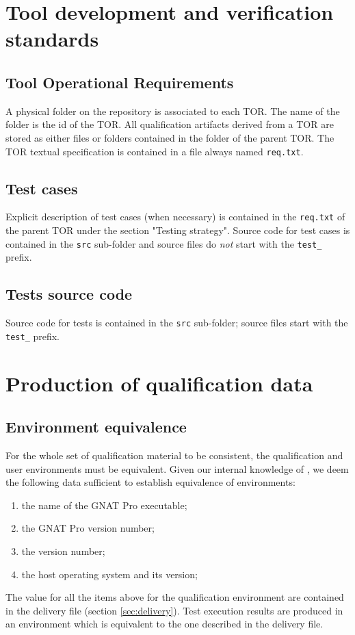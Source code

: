 \documentclass {report}
\begin{document}
\section{Tool development and verification standards}
\subsection{Tool Operational Requirements}
A physical folder on the repository is associated to each TOR. The name of the folder is the id of the TOR. All qualification artifacts derived from a TOR are stored as either files or folders contained in the folder of the parent TOR. The TOR textual specification is contained in a file always named \texttt{req.txt}.

\subsection{Test cases}
Explicit description of test cases (when necessary) is contained in the \texttt{req.txt} of the parent TOR under the section "Testing strategy". Source code for test cases is contained in the \texttt{src} sub-folder and source files do \emph{not} start with the \texttt{test\_} prefix. 

\subsection{Tests source code}
Source code for tests is contained in the \texttt{src} sub-folder; source files start with the \texttt{test\_} prefix. 

\section{Production of qualification data}

\subsection{Environment equivalence}
\label{sec:equivalence}
For the whole set of qualification material to be consistent, the qualification and user environments must be equivalent. Given our internal knowledge of \xcov, we deem the following data sufficient to establish equivalence of environments:
\begin{enumerate}
\item the name of the GNAT Pro executable;
\item the GNAT Pro version number;
\item the \xcov version number;
\item the host operating system and its version;
\end{enumerate}
The value for all the items above for the qualification environment are contained in the delivery file (section \ref{sec:delivery}). Test execution results are produced in an environment which is equivalent to the one described in the delivery file. 
\end{document}
